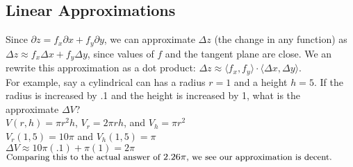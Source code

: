 \subsection{Linear Approximations}
\noindent
Since $\partial z = f_x\partial x + f_y\partial y$, we can approximate $\Delta z$ (the change in any function) as $\Delta z \approx f_x\Delta x + f_y\Delta y$, since values of $f$ and the tangent plane are close. We an rewrite this approximation as a dot product: $\Delta z \approx \langle f_x, f_y\rangle \cdot \langle \Delta x, \Delta y \rangle$.\\
For example, say a cylindrical can has a radius $r=1$ and a height $h=5$. If the radius is increased by .1 and the height is increased by 1, what is the approximate $\Delta V$?\\
\indent
$V(r,h) = \pi r^2 h$, $V_r = 2\pi rh$, and $V_h = \pi r^2$\\
\indent
$V_{r}(1,5) = 10\pi$ and $V_{h}(1,5) = \pi$\\
\indent
$\Delta V \approx 10\pi(.1) + \pi(1) = 2\pi$\\
\indent
$\small{\text{Comparing this to the actual answer of }2.26\pi\text{, we see our approximation is decent.}}$